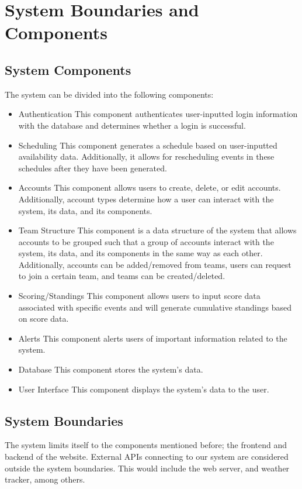\documentclass{article}
\begin{document}
\section{System Boundaries and Components}

\subsection{System Components}
The system can be divided into the following components:
\begin{itemize}
    \item Authentication
    \subitem This component authenticates user-inputted login information with the database
    and determines whether a login is successful.
    \item Scheduling
    \subitem This component generates a schedule based on user-inputted availability data. 
    Additionally, it allows for rescheduling events in these schedules after they 
    have been generated.
    \item Accounts
    \subitem This component allows users to create, delete, or edit accounts. Additionally, account types 
    determine how a user can interact with the system, its data, and its components.
    \item Team Structure
    \subitem This component is a data structure of the system that allows accounts to be grouped 
    such that a group of accounts interact with the system, its data, and its components in the same way as 
    each other. Additionally, accounts can be added/removed from teams, users can request to join a 
    certain team, and teams can be created/deleted.
    \item Scoring/Standings
    \subitem This component allows users to input score data associated with specific events and will 
    generate cumulative standings based on score data.
    \item Alerts
    \subitem This component alerts users of important information related to the system.
    \item Database
    \subitem This component stores the system's data.
    \item User Interface
    \subitem This component displays the system's data to the user.
\end{itemize}

\subsection{System Boundaries}
The system limits itself to the components mentioned before; the frontend and backend of the website.
External APIs connecting to our system are considered outside the system boundaries.
This would include the web server, and weather tracker, among others. 
\end{document}
